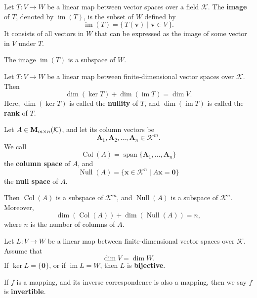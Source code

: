 \begin{definitionenv}
	Let $T : V \to W$ be a linear map between vector spaces over a field $\mathcal{K}$.
	The \textbf{image} of $T$, denoted by $\operatorname{im}(T)$, is the subset of $W$ defined by
	\[
	\operatorname{im}(T) = \{\, T(\bm{v}) \mid \bm{v} \in V \,\}.
	\]
	It consists of all vectors in $W$ that can be expressed as the image of some vector in $V$ under $T$.

\end{definitionenv}

\begin{remarkenv}
	The image $\operatorname{im}(T)$ is a subspace of $W$.
\end{remarkenv}

\begin{theoremenv}
	Let $T : V \to W$ be a linear map between finite-dimensional vector spaces over $\mathcal{K}$.
	Then
	\[
	\dim(\ker T) + \dim(\operatorname{im} T) = \dim V.
	\]
	Here, $\dim(\ker T)$ is called the \textbf{nullity} of $T$,
	and $\dim(\operatorname{im} T)$ is called the \textbf{rank} of $T$.
\end{theoremenv}

\begin{theoremenv}
	Let $A \in \mathbf{M}_{m \times n}(\mathcal{K})$, and let its column vectors be
	\[
	\bm{A}_1, \bm{A}_2, \dots, \bm{A}_n \in \mathcal{K}^m.
	\]
	We call
	\[
	\operatorname{Col}(A) = \operatorname{span}\{\bm{A}_1, \dots, \bm{A}_n\}
	\]
	the \textbf{column space} of $A$, and
	\[
	\operatorname{Null}(A) = \{\bm{x} \in \mathcal{K}^n \mid A\bm{x} = \bm{0}\}
	\]
	the \textbf{null space} of $A$.

	Then $\operatorname{Col}(A)$ is a subspace of $\mathcal{K}^m$,
	and $\operatorname{Null}(A)$ is a subspace of $\mathcal{K}^n$.
	Moreover,
	\[
	\dim(\operatorname{Col}(A)) + \dim(\operatorname{Null}(A)) = n,
	\]
	where $n$ is the number of columns of $A$.
\end{theoremenv}


\begin{theoremenv}
	Let $L : V \to W$ be a linear map between finite-dimensional vector spaces over $\mathcal{K}$.
	Assume that
	\[
	\dim V = \dim W.
	\]
	If $\ker L = \{\bm{0}\}$, or if $\operatorname{im} L = W$,
	then $L$ is \textbf{bijective}.
\end{theoremenv}

\begin{definitionenv}
	If $f$ is a mapping, and its inverse correspondence is also a mapping, then we say $f$ is \textbf{invertible}.
\end{definitionenv}

